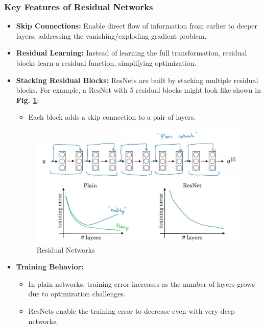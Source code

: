 \documentclass[letterpaper,12pt,notitlepage,twoside]{report}
\begin{document}
\subsubsection{Key Features of Residual Networks}
\begin{itemize}
    \item \textbf{Skip Connections:} Enable direct flow of information from earlier to deeper layers, addressing the vanishing/exploding gradient problem.
    \item \textbf{Residual Learning:} Instead of learning the full transformation, residual blocks learn a residual function, simplifying optimization.
    \item \textbf{Stacking Residual Blocks:} ResNets are built by stacking multiple residual blocks. For example, a ResNet with 5 residual blocks might look like shown in \textbf{Fig. \ref{fig:37}}:
    \begin{itemize}
        \item Each block adds a skip connection to a pair of layers.
    \end{itemize}

	\begin{figure}[h]
		\centering
		\includegraphics[width=\textwidth]{Images/Residual Networks.png}
		\caption{Residual Networks}
		\label{fig:37}
	\end{figure}
	\FloatBarrier

    \item \textbf{Training Behavior:} 
    \begin{itemize}
        \item In plain networks, training error increases as the number of layers grows due to optimization challenges.
        \item ResNets enable the training error to decrease even with very deep networks.
    \end{itemize}
\end{itemize}
\end{document}
